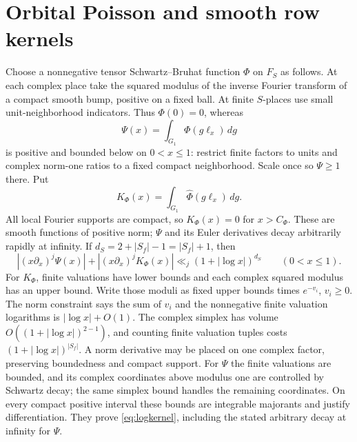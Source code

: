 \documentclass[11pt,a4paper]{article}
\numberwithin{equation}{section}
\theoremstyle{definition}
\theoremstyle{remark}
\newcommand{\dd}{\,d}
\newcommand{\wt}{\widehat}
\begin{document}
\section{Orbital Poisson and smooth row kernels}\label{sec:poisson}
Choose a nonnegative tensor Schwartz--Bruhat function $\Phi$ on $F_S$ as follows. At each complex place take the squared modulus of the inverse Fourier transform of a compact smooth bump, positive on a fixed ball. At finite $S$-places use small unit-neighborhood indicators. Thus $\Phi(0)=0$, whereas
\[
 \Psi(x)=\int_{G_1}\Phi(g\ell_x)\dd g
\]
is positive and bounded below on $0<x\le1$: restrict finite factors to units and complex norm-one ratios to a fixed compact neighborhood. Scale once so $\Psi\ge1$ there. Put
\[
 K_\Phi(x)=\int_{G_1}\wt\Phi(g\ell_x)\dd g.
\]
All local Fourier supports are compact, so $K_\Phi(x)=0$ for $x>C_\Phi$. These are smooth functions of positive norm; $\Psi$ and its Euler derivatives decay arbitrarily rapidly at infinity. If $d_S=2+|S_f|-1=|S_f|+1$, then
\begin{equation}\label{eq:logkernel}
 |(x\partial_x)^j\Psi(x)|+
 |(x\partial_x)^jK_\Phi(x)|
 \ll_j(1+|\log x|)^{d_S}\qquad(0<x\le1).
\end{equation}
For $K_\Phi$, finite valuations have lower bounds and each complex squared modulus has an upper bound. Write those moduli as fixed upper bounds times $e^{-v_i}$, $v_i\ge0$. The norm constraint says the sum of $v_i$ and the nonnegative finite valuation logarithms is $|\log x|+O(1)$. The complex simplex has volume $O((1+|\log x|)^{2-1})$, and counting finite valuation tuples costs $(1+|\log x|)^{|S_f|}$. A norm derivative may be placed on one complex factor, preserving boundedness and compact support. For $\Psi$ the finite valuations are bounded, and its complex coordinates above modulus one are controlled by Schwartz decay; the same simplex bound handles the remaining coordinates. On every compact positive interval these bounds are integrable majorants and justify differentiation. They prove \eqref{eq:logkernel}, including the stated arbitrary decay at infinity for $\Psi$.
\end{document}
